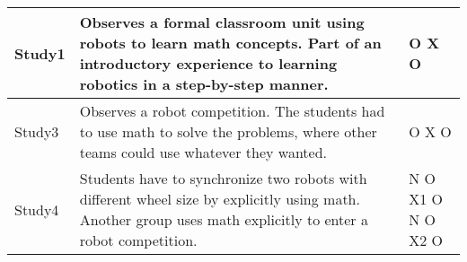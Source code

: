 \begin{longtable}{@{\extracolsep{\fill}}p{}p{}p{}}
	\tcite{silk2011resources}Study1 & Observes a formal classroom unit using robots to learn math concepts. Part of an introductory experience to learning robotics in a step-by-step manner.  & O X O\\\hline
	\tcite{silk2011resources}Study3 & Observes a robot competition. The students had to use math to solve the problems, where other teams could use whatever they wanted. & O X O\\\hline
	\tcite{silk2011resources}Study4 & Students have to synchronize two robots with different wheel size by explicitly using math. Another group uses math explicitly to enter a robot competition. & N O X1 O N O X2 O\\\hline
\end{longtable}
